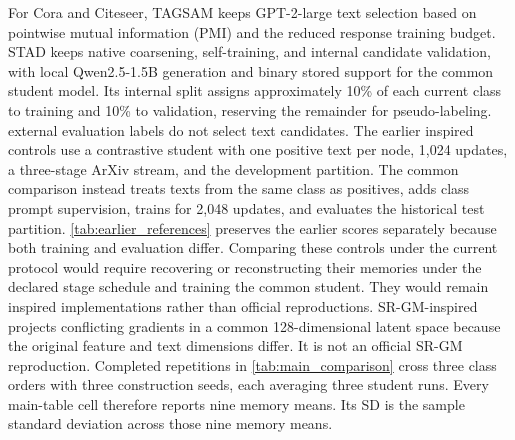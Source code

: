 For Cora and Citeseer, TAGSAM keeps GPT-2-large text selection based on
pointwise mutual information (PMI) and the reduced response training budget. STAD keeps native coarsening,
self-training, and internal candidate validation, with local
Qwen2.5-1.5B generation and binary stored support for the common student model.
Its internal split assigns approximately 10\% of each current class to
training and 10\% to validation, reserving the remainder for pseudo-labeling.
external evaluation labels do not select text candidates.
The earlier inspired controls use a contrastive student with one positive
text per node, 1,024 updates, a three-stage ArXiv stream, and the development
partition. The common comparison instead treats texts from the same class
as positives, adds class prompt supervision, trains for 2,048 updates, and
evaluates the historical test partition. \autoref{tab:earlier_references}
preserves the earlier scores separately because both training and evaluation
differ. Comparing these controls under the current protocol would require
recovering or reconstructing their memories under the declared stage
schedule and training the common student. They would remain inspired
implementations rather than official reproductions.
SR-GM-inspired projects conflicting
gradients in a common 128-dimensional latent space because the original
feature and text dimensions differ. It is not an official SR-GM reproduction.
Completed repetitions in \autoref{tab:main_comparison} cross three class
orders with three construction seeds, each averaging three student runs.
Every main-table cell therefore reports nine memory means. Its SD is the
sample standard deviation across those nine memory means.

\begin{table}[t]
\centering
\scriptsize
\caption{Earlier inspired references, kept separate from the common
comparison. Entries are Macro-F1 / Accuracy on the development partition, mean $\pm$ SD
over three student model seeds for one order and construction seed. These use
1,024 updates, one positive text per node in the contrastive loss, and a three-stage
ArXiv stream. These implementations differ from the original methods.}
\label{tab:earlier_references}
\end{table}


